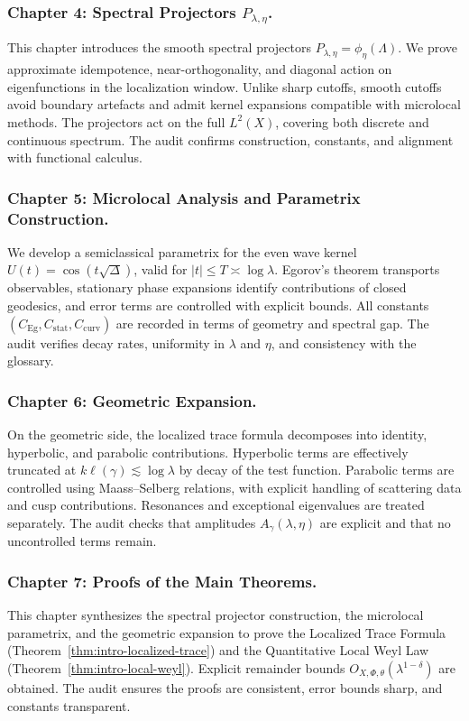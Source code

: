 \subsubsection*{Chapter 4: Spectral Projectors $P_{\lambda,\eta}$.}
This chapter introduces the smooth spectral projectors $P_{\lambda,\eta}=\phi_\eta(\Lambda)$.
We prove approximate idempotence, near-orthogonality,
and diagonal action on eigenfunctions in the localization window.
Unlike sharp cutoffs, smooth cutoffs avoid boundary artefacts
and admit kernel expansions compatible with microlocal methods.
The projectors act on the full $L^2(X)$, covering both discrete and continuous spectrum.
The audit confirms construction, constants, and alignment with functional calculus.

\subsubsection*{Chapter 5: Microlocal Analysis and Parametrix Construction.}
We develop a semiclassical parametrix for the even wave kernel $U(t)=\cos(t\sqrt{\Delta})$,
valid for $|t|\le T\asymp\log\lambda$.
Egorov’s theorem transports observables,
stationary phase expansions identify contributions of closed geodesics,
and error terms are controlled with explicit bounds.
All constants $(C_{\mathrm{Eg}},C_{\mathrm{stat}},C_{\mathrm{curv}})$
are recorded in terms of geometry and spectral gap.
The audit verifies decay rates, uniformity in $\lambda$ and $\eta$,
and consistency with the glossary.

\subsubsection*{Chapter 6: Geometric Expansion.}
On the geometric side,
the localized trace formula decomposes into identity, hyperbolic, and parabolic contributions.
Hyperbolic terms are effectively truncated at $k\ell(\gamma)\lesssim \log\lambda$
by decay of the test function.
Parabolic terms are controlled using Maass–Selberg relations,
with explicit handling of scattering data and cusp contributions.
Resonances and exceptional eigenvalues are treated separately.
The audit checks that amplitudes $A_\gamma(\lambda,\eta)$ are explicit
and that no uncontrolled terms remain.

\subsubsection*{Chapter 7: Proofs of the Main Theorems.}
This chapter synthesizes the spectral projector construction, the microlocal parametrix,
and the geometric expansion to prove
the Localized Trace Formula (Theorem~\ref{thm:intro-localized-trace})
and the Quantitative Local Weyl Law (Theorem~\ref{thm:intro-local-weyl}).
Explicit remainder bounds $O_{X,\Phi,\theta}(\lambda^{1-\delta})$ are obtained.
The audit ensures the proofs are consistent,
error bounds sharp, and constants transparent.

